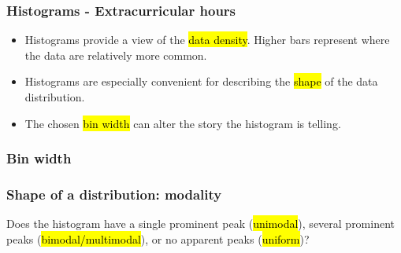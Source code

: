 \documentclass[slidestop,compress,mathserif]{beamer}
\begin{document}
\begin{frame}[fragile]
\frametitle{Histograms - Extracurricular hours}

\begin{itemize}

\item Histograms provide a view of the \hl{data density}. Higher bars represent where the data are relatively more common.

\item Histograms are especially convenient for describing the \hl{shape} of the data distribution.

\item The chosen \hl{bin width} can alter the story the histogram is telling.

\end{itemize}

\begin{center}
\end{center}

\end{frame}


\begin{frame}
\frametitle{Bin width}


\begin{center}
\end{center}

\end{frame}


\begin{frame}
\frametitle{Shape of a distribution: modality}

Does the histogram have a single prominent peak (\hl{unimodal}), several prominent peaks (\hl{bimodal/multimodal}), or no apparent peaks (\hl{uniform})?

\begin{center}
\end{center}


\end{frame}
\end{document}

